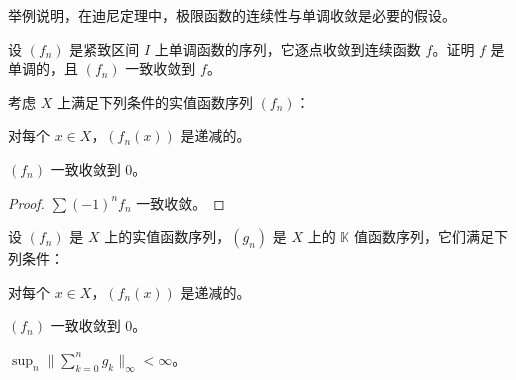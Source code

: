 \begin{exercises}
\item

举例说明，在迪尼定理中，极限函数的连续性与单调收敛是必要的假设。

\item

设 $ (f_n) $ 是紧致区间 $ I $ 上单调函数的序列，它逐点收敛到连续函数 $ f $。证明 $ f $ 是单调的，且 $ (f_n) $ 一致收敛到 $ f $。

\item

考虑 $ X $ 上满足下列条件的实值函数序列 $ (f_{n}) $：

\begin{subitems}
\item

对每个 $ x \in X $，$ (f_n(x)) $ 是递减的。

\item

$ (f_{n}) $ 一致收敛到 $ 0 $。

\end{subitems}

\end{exercises}

\begin{proof}

$ \sum(-1)^n f_n $ 一致收敛。

\end{proof}

\begin{exercises}
\item[7.]

设 $ (f_n) $ 是 $ X $ 上的实值函数序列，$ (g_n) $ 是 $ X $ 上的 $ \mathbb{K} $ 值函数序列，它们满足下列条件：

\begin{subitems}
\item

对每个 $ x \in X $，$ (f_n(x)) $ 是递减的。

\item

$ (f_{n}) $ 一致收敛到 $ 0 $。

\item

$ \sup_n\|\sum_{k=0}^{n} g_k\|_\infty < \infty $。

\end{subitems}

\end{exercises}

